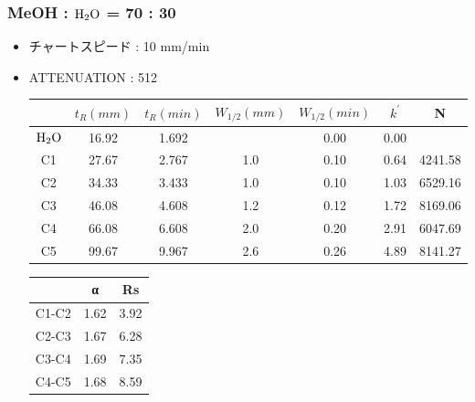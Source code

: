 \documentclass[a4paper,papersize,dvipdfmx]{jsarticle}
\begin{document}
\subsubsection*{MeOH : $\rm H_2O$ = 70 : 30}

\begin{itemize}
\item チャートスピード : 10 mm/min
\item ATTENUATION : 512

\begin{table}[H]
\begin{center}
\begin{tabular}{|c|c|c|c|c|c|c|}
\hline
&  $t_R(mm)$ & $t_R(min)$ & $W_{1/2}(mm)$ & $W_{1/2}(min)$ & $k^\prime$   & N    \\ \hline
$\rm H_2O$                & 16.92    & 1.692     &                & 0.00            & 0.00 &  \\ \hline
C1                 & 27.67    & 2.767     & 1.0            & 0.10            & 0.64 & 4241.58  \\ \hline
C2                 & 34.33    & 3.433     & 1.0            & 0.10            & 1.03 & 6529.16  \\ \hline
C3                 & 46.08    & 4.608     & 1.2            & 0.12            & 1.72 & 8169.06  \\ \hline
C4                 & 66.08    & 6.608     & 2.0            & 0.20            & 2.91 & 6047.69  \\ \hline
C5                 & 99.67    & 9.967     & 2.6            & 0.26            & 4.89 & 8141.27  \\ \hline
\end{tabular}
\end{center}
\end{table}

\begin{table}[H]
\begin{center}
\begin{tabular}{|c|c|c|}
\hline
& α     & Rs       \\ \hline
C1-C2 & 1.62 & 3.92 \\ \hline
C2-C3 & 1.67 & 6.28 \\ \hline
C3-C4 & 1.69 & 7.35 \\ \hline
C4-C5 & 1.68 & 8.59 \\ \hline
\end{tabular}
\end{center}
\end{table}


\end{itemize}
\end{document}

